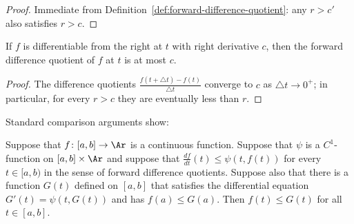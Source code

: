 \begin{proof}
\leanok
Immediate from Definition~\ref{def:forward-difference-quotient}: any
$r>c'$ also satisfies $r>c$.
\end{proof}

\begin{lemma}
\label{lem:right-derivative-forward-difference-quotient}
\leanok
{}
If $f$ is differentiable from the right at $t$ with right derivative
$c$, then the forward difference quotient of $f$ at $t$ is at most
$c$.
\end{lemma}

\begin{proof}
\leanok
The difference quotients $\frac{f(t+\triangle t)-f(t)}{\triangle t}$
converge to $c$ as $\triangle t\rightarrow 0^+$; in particular, for
every $r>c$ they are eventually less than $r$.
\end{proof}

Standard comparison arguments show:

\begin{lemma}
\label{lem:forward-difference-quotient}
\label{fordiffquot}
\leanok
{}
Suppose that $f\colon [a,b]\to \Ar$ is a continuous function. Suppose that
$\psi$ is a $C^1$-function on $[a,b]\times \Ar$ and suppose that
$\frac{df}{dt}(t)\le \psi(t,f(t))$ for every $t\in [a,b)$ in the sense of
forward difference quotients. Suppose also that there is a function $G(t)$
defined on $[a,b]$ that satisfies the differential equation
$G'(t)=\psi(t,G(t))$ and has $f(a)\le G(a)$. Then $f(t)\le G(t)$ for all $t\in
[a,b]$.
\end{lemma}

